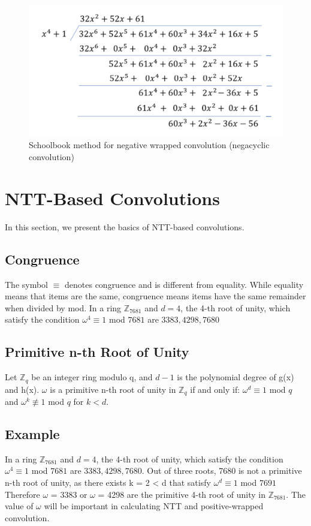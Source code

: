 \documentclass{techrep}
\theoremstyle{definition}
\theoremstyle{plain}
\newcommand{\Z}{\mathbb{Z}}
\begin{document}
\begin{figure}[H]
 	\centering
 	\includegraphics[width=.7\columnwidth]{fig/NWC_1.png}
 	\caption{Schoolbook method for negative wrapped convolution (negacyclic convolution)} 
\label{fig:NWC_1}
\end{figure}


\section{NTT-Based Convolutions}
In this section, we present the basics of NTT-based convolutions.

\subsection{Congruence}
The symbol $\equiv$ denotes congruence and is different from equality. While equality means that items are the same, congruence means items have the same remainder when divided by mod. In a ring $\Z_{7681}$  and $d = 4$, the 4-th root of unity, which satisfy the condition $\omega^4 \equiv 1$ mod $7681$ are ${3383, 4298, 7680}$

\subsection{Primitive n-th Root of Unity}
Let $\Z_{q}$  be an integer ring modulo q, and $d - 1$ is the polynomial degree of g(x) and h(x). $\omega$ is a primitive n-th root of unity in $\Z_{q}$ if and only if:
$\omega^d \equiv 1$ mod $q$ and $\omega^k \nequiv 1$ mod $q$  for $k < d$. 

\subsection{Example}
In a ring $\Z_{7681}$  and $d = 4$, the 4-th root of unity, which satisfy the condition $\omega^4 \equiv 1$ mod $7681$ are ${3383, 4298, 7680}$. Out of three roots, 7680 is not a primitive n-th root of unity, as there exists k = 2 < d that satisfy $\omega^d \equiv 1$ mod $7691$ Therefore $\omega$ = 3383 or $\omega$ = 4298 are the primitive 4-th root of unity in $\Z_{7681}$. The value of $\omega$  will be important in calculating NTT and positive-wrapped convolution.
\end{document}
